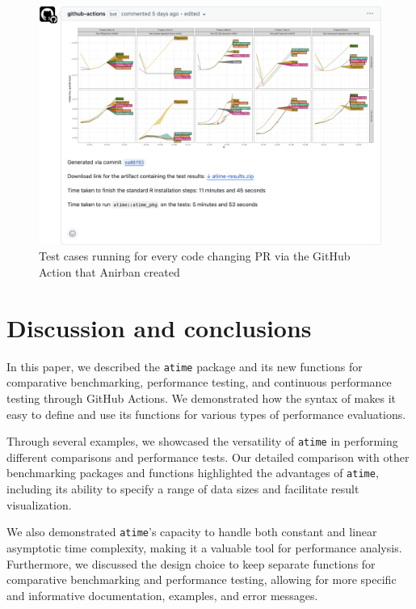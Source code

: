 \begin{figure}[H]
    \centering
    \includegraphics[width=1.0\linewidth]{figures/GHA2.png}
    \caption{Test cases running for every code changing PR via the GitHub Action that Anirban created}
    \label{fig:label5}
\end{figure}

\section{Discussion and conclusions}

In this paper, we described the \texttt{atime} package and its new functions for comparative benchmarking, performance testing, and continuous performance testing through GitHub Actions. We demonstrated how the syntax of  makes it easy to define and use its functions for various types of performance evaluations.

Through several examples, we showcased the versatility of \texttt{atime} in performing different comparisons and performance tests. Our detailed comparison with other benchmarking packages and functions highlighted the advantages of \texttt{atime}, including its ability to specify a range of data sizes and facilitate result visualization.

We also demonstrated \texttt{atime}'s capacity to handle both constant and linear asymptotic time complexity, making it a valuable tool for performance analysis. Furthermore, we discussed the design choice to keep separate functions for comparative benchmarking and performance testing, allowing for more specific and informative documentation, examples, and error messages.

